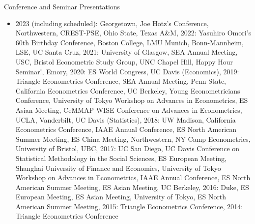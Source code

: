 \documentclass{article}
\begin{document}
\bigskip\noindent Conference and Seminar Presentations
\begin{itemize}
\item[] 
2023 (including scheduled): 
Georgetown,
Joe Hotz's Conference, 
Northwestern, 
CREST-PSE,
Ohio State, 
Texas A\&M, 
2022: 
Yasuhiro Omori's 60th Birthday Conference,
Boston College, 
LMU Munich,
Bonn-Mannheim, 
LSE,
UC Santa Cruz,
2021: 
University of Glasgow, 
SEA Annual Meeting, 
USC,
Bristol Econometric Study Group,
UNC Chapel Hill, 
Happy Hour Seminar!, 
Emory,
2020: 
ES World Congress, 
UC Davis (Economics),
2019: 
Triangle Econometrics Conference, 
SEA Annual Meeting, 
Penn State, 
California Econometrics Conference, 
UC Berkeley,
Young Econometricians Conference,
University of Tokyo Workshop on Advances in Econometrics, 
ES Asian Meeting,
CeMMAP WISE Conference on Advances in Econometrics,
UCLA,
Vanderbilt,
UC Davis (Statistics),
2018: 
UW Madison,
California Econometrics Conference,
IAAE Annual Conference,
ES North American Summer Meeting,
ES China Meeting,
Northwestern,
NY Camp Econometrics,
University of Bristol,
UBC,
2017: 
UC San Diego,
UC Davis Conference on Statistical Methodology in the Social Sciences,
ES European Meeting,
Shanghai University of Finance and Economics,
University of Tokyo Workshop on Advances in Econometrics,
IAAE Annual Conference,
ES North American Summer Meeting,
ES Asian Meeting,
UC Berkeley,
2016: 
Duke,
ES European Meeting,
ES Asian Meeting,
University of Tokyo,
ES North American Summer Meeting,
2015: 
Triangle Econometrics Conference,
2014: 
Triangle Econometrics Conference
\end{itemize}
\end{document}
